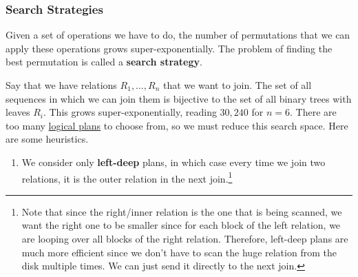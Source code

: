   \subsubsection{Search Strategies}  

    Given a set of operations we have to do, the number of permutations that we can apply these operations grows super-exponentially. The problem of finding the best permutation is called a \textbf{search strategy}. 

    \begin{example}
      \label{ex:left-deep-plans}
      Say that we have relations $R_1, \ldots, R_n$ that we want to join. The set of all sequences in which we can join them is bijective to the set of all binary trees with leaves $R_i$. This grows super-exponentially, reading $30,240$ for $n = 6$. There are too many \hyperref[def:logical-plan]{logical plans} to choose from, so we must reduce this search space. Here are some heuristics. 
      \begin{enumerate}
        \item We consider only \textbf{left-deep} plans, in which case every time we join two relations, it is the outer relation in the next join.\footnote{Note that since the right/inner relation is the one that is being scanned, we want the right one to be smaller since for each block of the left relation, we are looping over all blocks of the right relation. Therefore, left-deep plans are much more efficient since we don't have to scan the huge relation from the disk multiple times. We can just send it directly to the next join.} 

        \begin{figure}[H]
          \centering 
\end{figure}
\end{enumerate}
\end{example}
